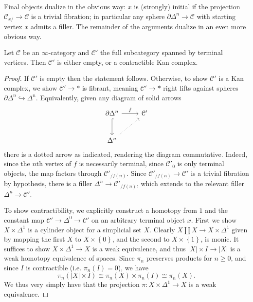 Final objects dualize in the obvious way: $x$ is (strongly) initial if the projection $\mathcal{C} _{x/} \to \mathcal{C} $ is a trivial fibration; in particular any sphere $\partial \Delta ^n\to \mathcal{C} $ with starting vertex $x$ admits a filler. The remainder of the arguments dualize in an even more obvious way.

\begin{proposition}\label{1.2.12.6}
	Let $\mathcal{C} $ be an $\infty $-category and $\mathcal{C} '$ the full subcategory spanned by terminal vertices. Then $\mathcal{C} '$ is either empty, or a contractible Kan complex.
\end{proposition}
\begin{proof}
	If $\mathcal{C} '$ is empty then the statement follows. Otherwise, to show $\mathcal{C} '$ is a Kan complex, we show $\mathcal{C} '\to *$ is fibrant, meaning $\mathcal{C} '\to *$ right lifts against spheres $\partial \Delta ^n\hookrightarrow \Delta ^n$. Equivalently, given any diagram of solid arrows
	\[\begin{tikzcd}[row sep = 2.5em, column sep = 2.5em]
	\partial \Delta ^n\ar[" f ", r] \ar[hook, d]  & \mathcal{C} ' \\
	\Delta ^n \ar[dotted, ur]  & 
	\end{tikzcd}\]
	there is a dotted arrow as indicated, rendering the diagram commutative. Indeed, since the $n$th vertex of $f$ is necessarily terminal, since $\mathcal{C} '_0$ is only terminal objects, the map factors through $\mathcal{C} '_{/f(n)} $. Since $\mathcal{C}' _{/f(n)} \to \mathcal{C}' $ is a trivial fibration by hypothesis, there is a filler $\Delta ^n\to \mathcal{C} '_{/f(n)} $, which extends to the relevant filler $\Delta ^n\to \mathcal{C} '$.

	To show contractibility, we explicitly construct a homotopy from $1$ and the constant map $\mathcal{C} '\to \Delta ^0\to \mathcal{C} '$ on an arbitrary terminal object $x$. First we show $X\times \Delta ^1$ is a cylinder object for a simplicial set $X$. Clearly $X\amalg X\to X\times \Delta ^1$ given by mapping the first $X$ to $X\times \left\{ 0 \right\} $, and the second to $X\times \left\{ 1 \right\} $, is monic. It suffices to show $X\times \Delta ^1\to X$ is a weak equivalence, and thus $\left| X \right| \times I\to \left| X \right| $ is a weak homotopy equivalence of spaces. Since $\pi _n$ preserves products for $n\geq 0$, and since $I$ is contractible (i.e. $\pi _n(I)=0$), we have
	\[
		\pi _n(\left| X \right| \times I)\cong \pi _n(X)\times \pi _n(I)\cong \pi _n(X)
	.\]
	We thus very simply have that the projection $\pi : X\times \Delta ^1 \to X$ is a weak equivalence.


\end{proof}
